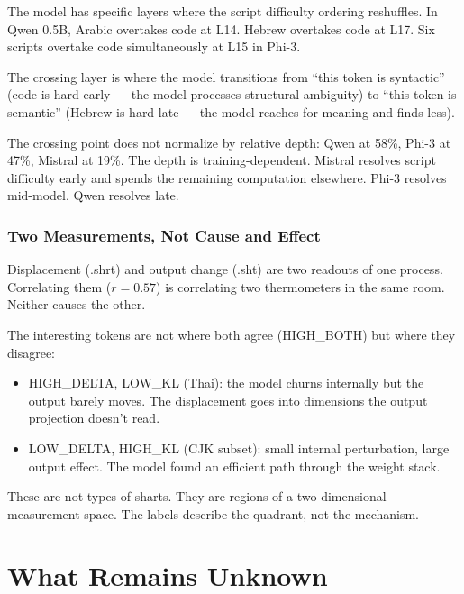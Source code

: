 \documentclass[11pt,a4paper]{article}
\begin{document}
The model has specific layers where the script difficulty ordering reshuffles. In Qwen 0.5B, Arabic overtakes code at L14. Hebrew overtakes code at L17. Six scripts overtake code simultaneously at L15 in Phi-3.

The crossing layer is where the model transitions from ``this token is syntactic'' (code is hard early --- the model processes structural ambiguity) to ``this token is semantic'' (Hebrew is hard late --- the model reaches for meaning and finds less).

The crossing point does not normalize by relative depth: Qwen at 58\%, Phi-3 at 47\%, Mistral at 19\%. The depth is training-dependent. Mistral resolves script difficulty early and spends the remaining computation elsewhere. Phi-3 resolves mid-model. Qwen resolves late.

\section{Two Measurements, Not Cause and Effect}

Displacement (.shrt) and output change (.sht) are two readouts of one process. Correlating them ($r = 0.57$) is correlating two thermometers in the same room. Neither causes the other.

The interesting tokens are not where both agree (HIGH\_BOTH) but where they disagree:

\begin{itemize}[nosep]
\item HIGH\_DELTA, LOW\_KL (Thai): the model churns internally but the output barely moves. The displacement goes into dimensions the output projection doesn't read.
\item LOW\_DELTA, HIGH\_KL (CJK subset): small internal perturbation, large output effect. The model found an efficient path through the weight stack.
\end{itemize}

These are not types of sharts. They are regions of a two-dimensional measurement space. The labels describe the quadrant, not the mechanism.

\part{What Remains Unknown}
\end{document}
